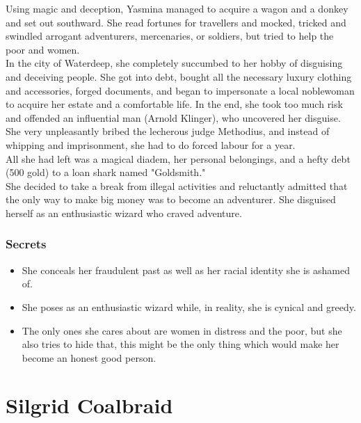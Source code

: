 \documentclass[10pt,onecolumn,twoside,openany,bg=full,layout=true]{dndbook}
\begin{document}
Using magic and deception, Yasmina managed to acquire a wagon and a donkey and set out southward.
She read fortunes for travellers and mocked, tricked and swindled arrogant adventurers, mercenaries, or soldiers,
but tried to help the poor and women.\\
In the city of Waterdeep, she completely succumbed to her hobby of disguising and deceiving people.
She got into debt, bought all the necessary luxury clothing and accessories, forged documents, and began to impersonate
a local noblewoman to acquire her estate and a comfortable life.
In the end, she took too much risk and offended an influential man (Arnold Klinger), who uncovered her disguise.
She very unpleasantly bribed the lecherous judge Methodius, and instead of whipping and imprisonment,
she had to do forced labour for a year.\\
All she had left was a magical diadem, her personal belongings, and a hefty debt (500 gold) to a loan shark named "Goldsmith."\\
She decided to take a break from illegal activities and reluctantly admitted that the only way to make big money was
to become an adventurer.
She disguised herself as an enthusiastic wizard who craved adventure.

\subsubsection{Secrets}\label{subsec:yasmina-secrets}
\begin{itemize}
\item She conceals her fraudulent past as well as her racial identity she is ashamed of.
\item She poses as an enthusiastic wizard while, in reality, she is cynical and greedy.
\item The only ones she cares about are women in distress and the poor, but she also tries to hide that,
this might be the only thing which would make her become an honest good person.
\end{itemize}

\vfill
\pagebreak

\section{Silgrid Coalbraid}\label{sec:silgrid-coalbraid}
\end{document}
